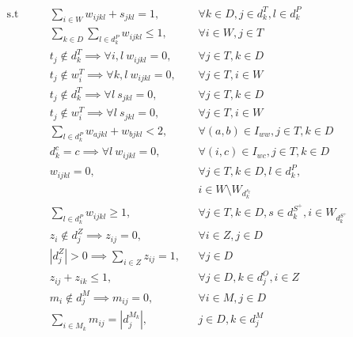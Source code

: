 \documentclass[../../thesis.tex]{subfiles}
\begin{document}
\begin{align}
    \textrm{s.t} \qquad & \sum_{i \in W} w_{ijkl} + s_{jkl} = 1, && \forall k \in D, j \in d_k^T, l \in d_k^P \label{wc1} \\
    & \sum_{k \in D} \sum_{l \in d_k^P} w_{ijkl} \leq 1, && \forall i \in W, j \in T \label{wc2} \\
    & t_j \notin d^T_{k} \implies \forall i, l \ w_{ijkl} = 0,  && \forall j \in T , k \in D \label{wc3} \\
    & t_j \notin w^T_{i} \implies \forall k, l \ w_{ijkl} = 0, && \forall j \in T, i \in W \label{wc4} \\ 
    & t_j \notin d^T_{k} \implies \forall l \ s_{jkl} = 0,  && \forall j \in T , k \in D \label{sc1} \\
    & t_j \notin w^T_{i} \implies \forall l \ s_{jkl} = 0, && \forall j \in T, i \in W \label{sc2} \\ 
    & \sum_{l \in d^P_k} w_{ajkl} + w_{bjkl} < 2, &&  \forall {(a, b) \in I_{ww}}, j \in T, k \in D \label{wc5} \\
    & d^c_{k} = c \implies \forall l \ w_{ijkl} = 0, && \forall {(i, c) \in I_{wc}}, j \in T, k \in D \label{wc6} \\ 
    & w_{ijkl} = 0, && \forall j \in T, k \in D, l \in d^P_k, \nonumber \\
    & && i \in W \setminus W_{d^{s_l}_k} \label{wc7} \\
    & \sum_{l \in d_k^P} w_{ijkl} \geq 1, && \forall j \in T, k \in D, s \in d^{S^+}_k, i \in W_{d^{S^+}_k} \label{wc8} \\
    & z_i \notin d^Z_j \implies z_{ij} = 0, && \forall i \in Z, j \in D \label{zc1}  \\
    & |d^Z_j| > 0 \implies \sum_{i \in Z} z_{ij} = 1, && \forall j \in D \label{zc2} \\
    & z_{ij} + z_{ik} \leq 1, && \forall j \in D, k \in d^O_j, i \in Z \label{zc3} \\
    & m_i \notin d^M_j \implies m_{ij} = 0, && \forall i \in M, j \in D  \label{mc1} \\
    & \sum_{i \in M_k} m_{ij} = |d^{M_k}_j|, && j \in D, k \in d^M_j  \label{mc2} \\

\end{align}
\end{document}
